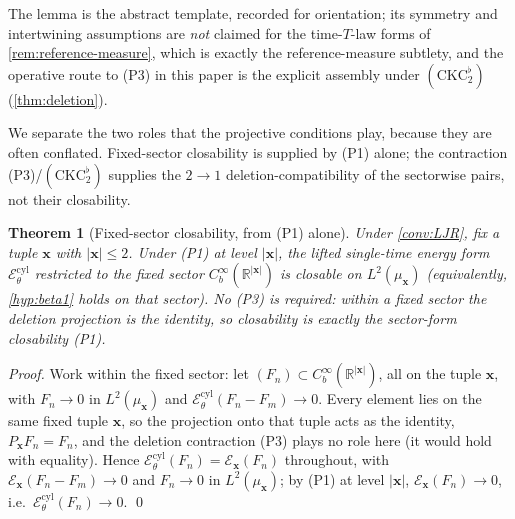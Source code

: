 \documentclass[reqno,final,11pt]{amsart}
\theoremstyle{plain}
\newtheorem{theorem}{Theorem}[section]
\theoremstyle{definition}
\theoremstyle{remark}
\newcommand{\R}{\mathbb R}
\newcommand{\cE}{\mathcal E}
\newcommand{\Ecyl}{\cE^{\mathrm{cyl}}_{\theta}}
\begin{document}
The lemma is the abstract template, recorded for orientation; its symmetry
and intertwining assumptions are \emph{not} claimed for the time-$T$-law
forms of \cref{rem:reference-measure}, which is exactly the
reference-measure subtlety, and the operative route to \textnormal{(P3)} in
this paper is the explicit assembly under $(\mathrm{CKC}_2^{\flat})$
(\cref{thm:deletion}).

We separate the two roles that the projective conditions play, because they are
often conflated. Fixed-sector closability is supplied by (P1) alone; the
contraction (P3)/$(\mathrm{CKC}_2^{\flat})$ supplies the $2\to1$
deletion-compatibility of the sectorwise pairs, not their closability.

\begin{theorem}[Fixed-sector closability, from \textnormal{(P1)} alone]\label{thm:sectorclos}
Under \cref{conv:LJR}, fix a tuple $\mathbf x$ with $|\mathbf x|\le2$. Under
\textnormal{(P1)} at level $|\mathbf x|$, the lifted single-time energy form
$\Ecyl$ restricted to the fixed sector $C_b^\infty(\R^{|\mathbf x|})$ is closable
on $L^2(\mu_{\mathbf x})$ (equivalently, \cref{hyp:beta1} holds on that sector).
No \textnormal{(P3)} is required: within a fixed sector the deletion projection is
the identity, so closability is exactly the sector-form closability
\textnormal{(P1)}.
\end{theorem}
\begin{proof}
Work within the fixed sector: let $(F_n)\subset C_b^\infty(\R^{|\mathbf x|})$, all
on the tuple $\mathbf x$, with $F_n\to0$ in $L^2(\mu_{\mathbf x})$ and
$\Ecyl(F_n-F_m)\to0$. Every element lies on the same fixed tuple $\mathbf x$, so
the projection onto that tuple acts as the identity, $P_{\mathbf x}F_n=F_n$, and
the deletion contraction (P3) plays no role here (it would hold with
equality). Hence $\Ecyl(F_n)=\cE_{\mathbf x}(F_n)$ throughout, with
$\cE_{\mathbf x}(F_n-F_m)\to0$ and $F_n\to0$ in $L^2(\mu_{\mathbf x})$; by (P1) at
level $|\mathbf x|$, $\cE_{\mathbf x}(F_n)\to0$, i.e.\ $\Ecyl(F_n)\to0$. \qed
\end{proof}
\end{document}
